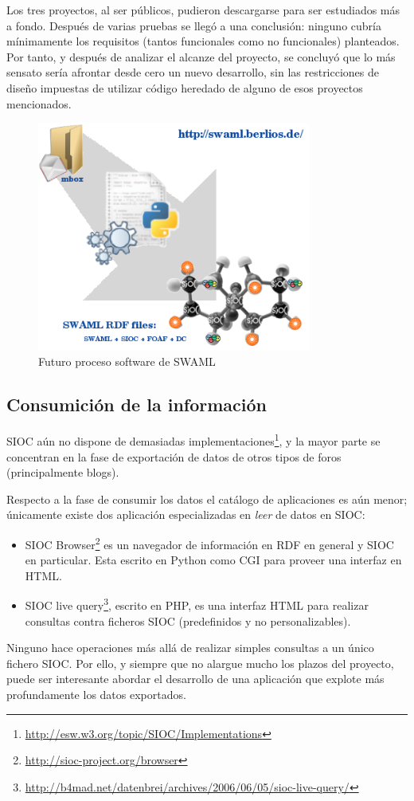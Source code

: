 Los tres proyectos, al ser públicos, pudieron descargarse para ser estudiados más a fondo. Después
de varias pruebas se llegó a una conclusión: ninguno cubría mínimamente los requisitos (tantos 
funcionales como no funcionales) planteados. Por tanto, y después de analizar el alcanze del
proyecto, se concluyó que lo más sensato sería afrontar desde cero un nuevo desarrollo, sin las 
restricciones de diseño impuestas de utilizar código heredado de alguno de esos proyectos 
mencionados.

\begin{figure}[H]
	\centering
	\includegraphics[width=9cm]{images/swaml-process.png}
	\caption{Futuro proceso software de SWAML}
	\label{fig:swamlProcess}
\end{figure}


\subsection{Consumición de la información}

SIOC aún no dispone de demasiadas implementaciones\footnote{\url{http://esw.w3.org/topic/SIOC/Implementations}},
y la mayor parte se concentran en la fase de exportación de datos de otros
tipos de foros (principalmente blogs). 

Respecto a la fase de consumir los datos el catálogo de aplicaciones es aún 
menor; únicamente existe dos aplicación especializadas en \emph{leer} de datos 
en SIOC:

\begin{itemize}
  \item SIOC Browser\footnote{\url{http://sioc-project.org/browser}} es un 
	navegador de información en RDF en general y SIOC en particular. 
	Esta escrito en Python como CGI para proveer una interfaz en HTML.
  \item SIOC live query\footnote{\url{http://b4mad.net/datenbrei/archives/2006/06/05/sioc-live-query/}},
	escrito en PHP, es una interfaz HTML para realizar consultas
	contra ficheros SIOC (predefinidos y no personalizables).
\end{itemize}

Ninguno hace operaciones más allá de realizar simples consultas a un único fichero 
SIOC. Por ello, y siempre que no alargue mucho los plazos del proyecto, puede ser 
interesante abordar el desarrollo de una aplicación que explote más profundamente
los datos exportados.
